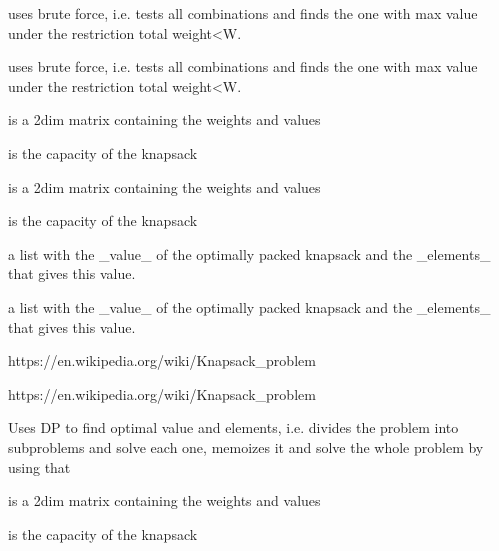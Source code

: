 \documentclass[a4paper]{book}
\begin{document}
%
\begin{Description}\relax
uses brute force, i.e. tests all combinations and finds the one with max value under the restriction total weight<W.

uses brute force, i.e. tests all combinations and finds the one with max value under the restriction total weight<W.
\end{Description}
%
\begin{Arguments}
\begin{ldescription}
\item[\code{x}] is a 2dim matrix containing the weights and values

\item[\code{W}] is the capacity of the knapsack

\item[\code{x}] is a 2dim matrix containing the weights and values

\item[\code{W}] is the capacity of the knapsack
\end{ldescription}
\end{Arguments}
%
\begin{Value}
a list with the \_value\_ of the optimally packed knapsack and the \_elements\_ that gives this value.

a list with the \_value\_ of the optimally packed knapsack and the \_elements\_ that gives this value.
\end{Value}
%
\begin{References}\relax
https://en.wikipedia.org/wiki/Knapsack\_problem

https://en.wikipedia.org/wiki/Knapsack\_problem
\end{References}
%
\begin{Description}\relax
Uses DP to find optimal value and elements, i.e. divides the problem into subproblems and solve each one, memoizes it and solve the whole problem by using that
\end{Description}
%
\begin{Arguments}
\begin{ldescription}
\item[\code{x}] is a 2dim matrix containing the weights and values

\item[\code{W}] is the capacity of the knapsack
\end{ldescription}
\end{Arguments}
\end{document}
